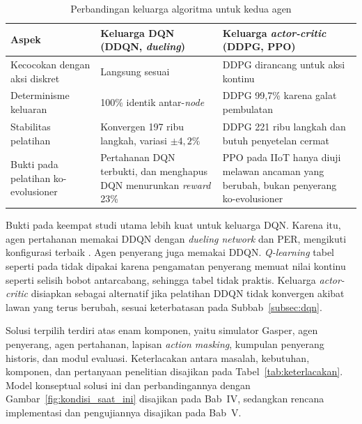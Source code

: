 \begin{table}[htbp]
\centering
\caption{Perbandingan keluarga algoritma untuk kedua agen}
\label{tab:algoritma}
\small
\begin{tabular}{|p{3.0cm}|p{4.8cm}|p{4.8cm}|}
\hline
\textbf{Aspek} & \textbf{Keluarga DQN (DDQN, \textit{dueling})} & \textbf{Keluarga \textit{actor-critic} (DDPG, PPO)} \\
\hline
Kecocokan dengan aksi diskret & Langsung sesuai & DDPG dirancang untuk aksi kontinu \parencite{skowronski2026adaptive} \\
\hline
Determinisme keluaran & 100\% identik antar-\textit{node} \parencite{skowronski2026adaptive} & DDPG 99,7\% karena galat pembulatan \parencite{skowronski2026adaptive} \\
\hline
Stabilitas pelatihan & Konvergen 197 ribu langkah, variasi $\pm 4{,}2\%$ \parencite{skowronski2026adaptive} & DDPG 221 ribu langkah dan butuh penyetelan cermat \parencite{skowronski2026adaptive} \\
\hline
Bukti pada pelatihan ko-evolusioner & Pertahanan DQN terbukti, dan menghapus DQN menurunkan \textit{reward} 23\% \parencite{wushishi2026coadam} & PPO pada IIoT hanya diuji melawan ancaman yang berubah, bukan penyerang ko-evolusioner \parencite{wushishi2026coadam} \\
\hline
\end{tabular}
\end{table}

Bukti pada keempat studi utama lebih kuat untuk keluarga DQN. Karena itu, agen pertahanan memakai DDQN dengan \textit{dueling network} dan PER, mengikuti konfigurasi terbaik \textcite{skowronski2026adaptive}. Agen penyerang juga memakai DDQN. \textit{Q-learning} tabel seperti pada \textcite{wushishi2026coadam} tidak dipakai karena pengamatan penyerang memuat nilai kontinu seperti selisih bobot antarcabang, sehingga tabel tidak praktis. Keluarga \textit{actor-critic} disiapkan sebagai alternatif jika pelatihan DDQN tidak konvergen akibat lawan yang terus berubah, sesuai keterbatasan pada Subbab~\ref{subsec:dqn}.

Solusi terpilih terdiri atas enam komponen, yaitu simulator Gasper, agen penyerang, agen pertahanan, lapisan \textit{action masking}, kumpulan penyerang historis, dan modul evaluasi. Keterlacakan antara masalah, kebutuhan, komponen, dan pertanyaan penelitian disajikan pada Tabel~\ref{tab:keterlacakan}. Model konseptual solusi ini dan perbandingannya dengan Gambar~\ref{fig:kondisi_saat_ini} disajikan pada Bab~IV, sedangkan rencana implementasi dan pengujiannya disajikan pada Bab~V.

